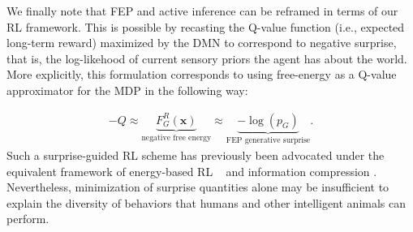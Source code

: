 \documentclass[10pt,letterpaper]{article}
\def\z{\mathbf{z}}
\def\x{\mathbf{x}}
\begin{document}
We finally note that FEP and active inference can be reframed in terms of
our RL framework.
This is possible by recasting the Q-value function (i.e., expected long-term reward) maximized by the DMN to
correspond to negative surprise,
that is, the log-likehood of current sensory priors
the agent has about the world. More explicitly,
this formulation corresponds to using free-energy as a Q-value approximator for the MDP in the following way:

\begin{eqnarray*}
  -Q \approx \underbrace{F^R_G(\x)}_{\text{negative free energy}} \approx \underbrace{-\log (p_G)}_{\text{FEP generative surprise}}.
    \end{eqnarray*}
Such a surprise-guided RL scheme has previously been advocated
under the equivalent framework of energy-based RL
~\citep{sallans2004,elfwing2016free} and information compression \citep{schmidhuber2010,mohamed2015}.
Nevertheless, minimization of surprise quantities alone
may be insufficient to explain the diversity of behaviors that humans and other intelligent animals can perform.
\end{document}
